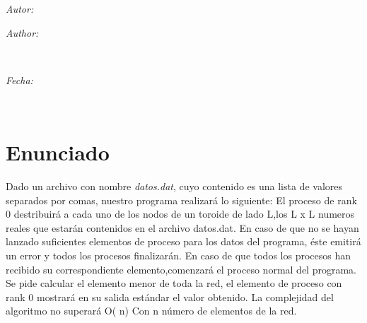 \documentclass[11pt]{article}
\makeatletter
\newif\ifspanish %
\newif\ifmultipleauthors %
\newcommand{\dateText}{Fecha:}
\newcommand{\dateText}{Date:}
\let\theauthor\@author
\let\thedate\@date
\makeatother
\begin{document}
\begin{titlepage}
	\vspace*{\fill}
	\begin{minipage}{0.4\textwidth}
		\begin{flushleft} \large
			\ifspanish
				\ifmultipleauthors
					\emph{Autores:}\\
				\else
					\emph{Autor:}\\
				\fi
			\else
				\ifmultipleauthors
					\emph{Authors:}\\
				\else
					\emph{Author:}\\
				\fi
			\fi
			\theauthor
			\end{flushleft}
			\end{minipage}~
			\begin{minipage}{0.4\textwidth}
			\begin{flushright} \large
			\emph{\dateText} \\
			\thedate
		\end{flushright}
	\end{minipage}\\[2.25 cm]


\end{titlepage}


\tableofcontents
\pagebreak


\section{Enunciado}
Dado un archivo con nombre \textit{datos.dat}, cuyo contenido es una lista de valores separados por comas, nuestro programa realizará lo siguiente: El proceso de rank 0 destribuirá a cada uno de los nodos de un toroide de lado L,los L x L numeros reales que estarán contenidos en el archivo datos.dat. En caso de que no se hayan lanzado suficientes elementos de proceso
para los datos del programa, éste emitirá un error y todos los procesos finalizarán. En caso de que todos los procesos han recibido su correspondiente elemento,comenzará el proceso normal del programa. Se pide calcular el elemento menor de toda la red, el elemento de proceso con rank 0 mostrará en su salida estándar el valor obtenido. 
La complejidad del algoritmo no superará O( n) Con n número de elementos de la red.


\end{document}
